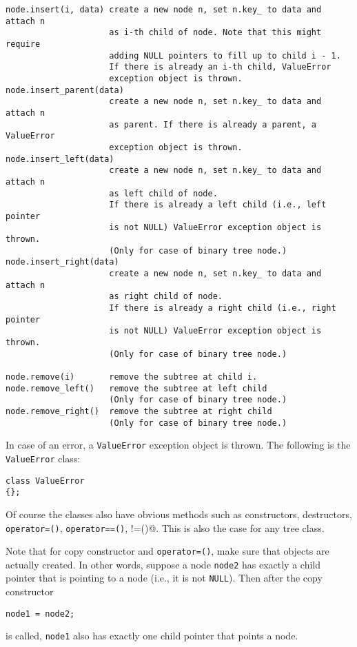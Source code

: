 \begin{Verbatim}[frame=single,fontsize=\footnotesize]
node.insert(i, data) create a new node n, set n.key_ to data and attach n 
                     as i-th child of node. Note that this might require
                     adding NULL pointers to fill up to child i - 1.
                     If there is already an i-th child, ValueError 
                     exception object is thrown. 
node.insert_parent(data)
                     create a new node n, set n.key_ to data and attach n 
                     as parent. If there is already a parent, a ValueError
                     exception object is thrown.
node.insert_left(data)
                     create a new node n, set n.key_ to data and attach n 
                     as left child of node.
                     If there is already a left child (i.e., left pointer
                     is not NULL) ValueError exception object is thrown.
                     (Only for case of binary tree node.)
node.insert_right(data)
                     create a new node n, set n.key_ to data and attach n 
                     as right child of node.
                     If there is already a right child (i.e., right pointer
                     is not NULL) ValueError exception object is thrown.
                     (Only for case of binary tree node.)

node.remove(i)       remove the subtree at child i.
node.remove_left()   remove the subtree at left child 
                     (Only for case of binary tree node.)
node.remove_right()  remove the subtree at right child 
                     (Only for case of binary tree node.)
\end{Verbatim}

In case of an error, a \verb!ValueError! exception object is thrown.
The following is the \verb!ValueError! class:
\begin{Verbatim}[frame=single,fontsize=\footnotesize]
class ValueError
{};
\end{Verbatim}

Of course the classes also have obvious methods
such as constructors, destructors, 
\verb!operator=()!, \verb!operator==()!, \verb@operator!=()@.
This is also the case for any tree class.

Note that for copy constructor and \verb!operator=()!, 
make sure that objects are actually created.
In other words, suppose a node \verb!node2!
has exactly a child pointer that is pointing
to a node (i.e., it is not \verb!NULL!).
Then after the copy constructor 
\begin{Verbatim}[frame=single,fontsize=\footnotesize]
node1 = node2;
\end{Verbatim}
is called, \verb!node1! also has exactly one child pointer
that points a node.

